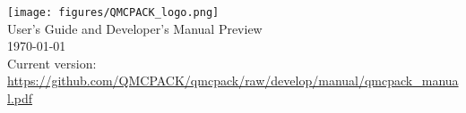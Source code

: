
\begin{titlepage}
\vspace*{\fill}
\begin{center}

\texttt{[image: figures/QMCPACK\_logo.png]} \\
{\huge User's Guide and Developer's Manual Preview\\}
{
\huge %
\today}\\
{\small Current version: \url{https://github.com/QMCPACK/qmcpack/raw/develop/manual/qmcpack_manual.pdf}}
\end{center}
\vspace*{\fill}
\end{titlepage}
